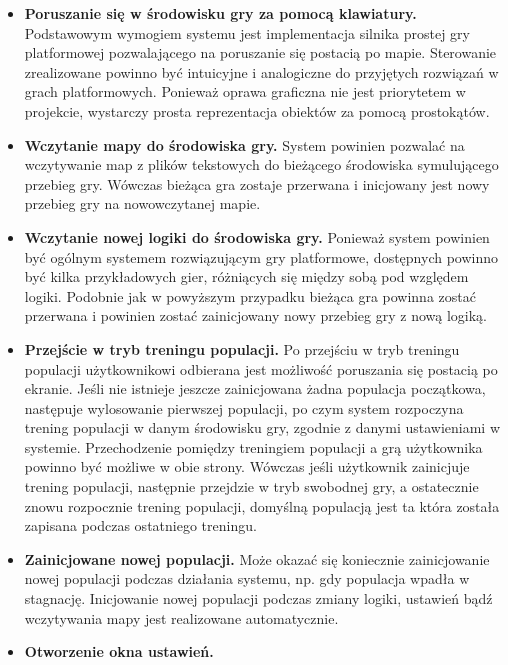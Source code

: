 	\begin{itemize}
		\item {\bf Poruszanie się w środowisku gry za pomocą klawiatury.}
		\newline
		Podstawowym wymogiem systemu jest implementacja silnika prostej gry platformowej pozwalającego na poruszanie się postacią po mapie.
		Sterowanie zrealizowane powinno być intuicyjne i analogiczne do przyjętych rozwiązań w grach platformowych.
		Ponieważ oprawa graficzna nie jest priorytetem w projekcie, wystarczy prosta reprezentacja obiektów za pomocą prostokątów.
		\item {\bf Wczytanie mapy do środowiska gry.}
		\newline
		System powinien pozwalać na wczytywanie map z plików tekstowych do bieżącego środowiska symulującego przebieg gry.
		Wówczas bieżąca gra zostaje przerwana i inicjowany jest nowy przebieg gry na nowowczytanej mapie.
		\item {\bf Wczytanie nowej logiki do środowiska gry.}
		\newline
		Ponieważ system powinien być ogólnym systemem rozwiązującym gry platformowe, dostępnych powinno być kilka przykładowych gier,
		różniących się między sobą pod względem logiki. Podobnie jak w powyższym przypadku bieżąca gra powinna zostać przerwana i
		powinien zostać zainicjowany nowy przebieg gry z nową logiką.
		\item {\bf Przejście w tryb treningu populacji.}
		\newline
		Po przejściu w tryb treningu populacji użytkownikowi odbierana jest możliwość poruszania się postacią po ekranie.
		Jeśli nie istnieje jeszcze zainicjowana żadna populacja początkowa, następuje wylosowanie pierwszej populacji, po czym system rozpoczyna trening populacji w danym środowisku gry, zgodnie z danymi ustawieniami w systemie. Przechodzenie pomiędzy treningiem populacji a grą użytkownika powinno być możliwe w obie strony. 
		Wówczas jeśli użytkownik zainicjuje trening populacji, następnie przejdzie w tryb swobodnej gry, a ostatecznie znowu rozpocznie trening populacji, domyślną populacją jest ta która została zapisana podczas ostatniego treningu.
		\item {\bf Zainicjowane nowej populacji. }
		\newline
		Może okazać się koniecznie zainicjowanie nowej populacji podczas działania systemu, np. gdy populacja wpadła w stagnację.
		Inicjowanie nowej populacji podczas zmiany logiki, ustawień bądź wczytywania mapy jest realizowane automatycznie.
		\item {\bf Otworzenie okna ustawień.}

\end{itemize}
